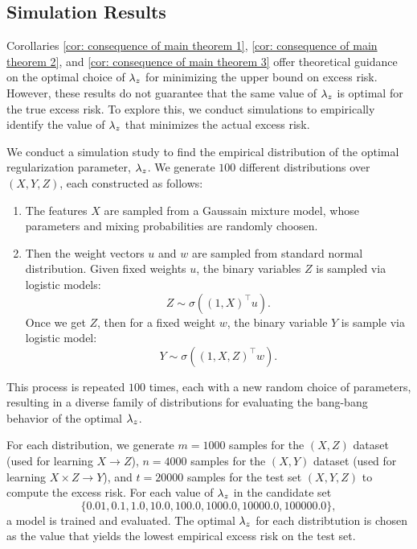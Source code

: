 
\subsection{Simulation Results}

Corollaries \ref{cor: consequence of main theorem 1}, \ref{cor: consequence of main theorem 2}, and \ref{cor: consequence of main theorem 3} offer theoretical guidance on the optimal choice of $\lambda_z$ for minimizing the upper bound on excess risk. However, these results do not guarantee that the same value of $\lambda_z$ is optimal for the true excess risk. To explore this, we conduct simulations to empirically identify the value of $\lambda_z$ that minimizes the actual excess risk.

We conduct a simulation study to find the empirical distribution of the optimal regularization parameter, $\lambda_z$. We generate $100$ different distributions over $(X, Y, Z)$, each constructed as follows:

\begin{enumerate}
    \item The features $X$ are sampled from a Gaussain mixture model, whose parameters and mixing probabilities are randomly choosen.
    
    \item Then the weight vectors $u$ and $w$ are sampled from standard normal distribution.    
    Given fixed weights $u$, the binary variables $Z$ is sampled via logistic models:
    \[ Z \sim \sigma((1,X)^\top u).\]
    Once we get $Z$, then for a fixed weight $w$, the binary variable $Y$ is sample via logistic model:
    \[ Y \sim \sigma((1,X,Z)^\top w).\]
    
\end{enumerate}

This process is repeated $100$ times, each with a new random choice of parameters, resulting in a diverse family of distributions for evaluating the bang-bang behavior of the optimal $\lambda_z$.

For each distribution, we generate $m=1000$ samples for the $(X, Z)$ dataset (used for learning $X \to Z$), $n=4000$ samples for the $(X, Y)$ dataset (used for learning $X \times Z \to Y$), and $t=20000$ samples for the test set $(X, Y, Z)$ to compute the excess risk. 
For each value of $\lambda_z$ in the candidate set
\begin{equation*}
    \{0.01, 0.1, 1.0, 10.0, 100.0, 1000.0, 10000.0, 100000.0\},
\end{equation*}
a model is trained and evaluated. The optimal $\lambda_z$ for each distribtution is chosen as the value that yields the lowest empirical excess risk on the test set.

